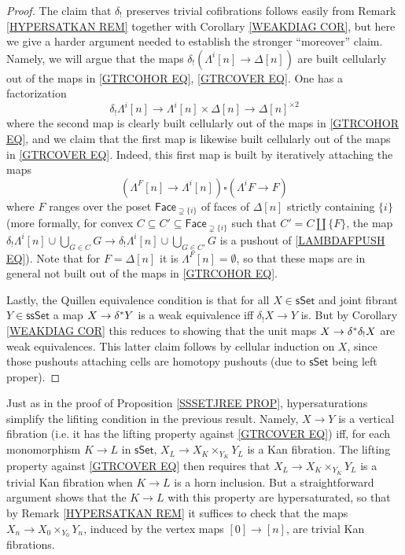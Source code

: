 \documentclass[a4paper,10pt
]{article}%
\begin{document}
\begin{proof}
The claim that $\delta_!$ preserves trivial cofibrations follows easily from Remark \ref{HYPERSATKAN REM} together with Corollary \ref{WEAKDIAG COR}, but here we give a harder argument needed to establish the stronger ``moreover'' claim.
Namely, we will argue that the maps
$\delta_! \left( \Lambda^i[n] \to \Delta[n]\right)$
are built cellularly out of the maps in 
\eqref{GTRCOHOR EQ}, \eqref{GTRCOVER EQ}.
One has a factorization
\[
	\delta_! \Lambda^i[n] \to
	\Lambda^i[n] \times \Delta[n] \to \Delta[n]^{\times 2}
\]
where the second map is clearly built cellularly out of the maps in 
\eqref{GTRCOHOR EQ}, and we claim that 
the first map is likewise built cellularly out of the maps in \eqref{GTRCOVER EQ}.
Indeed, this first map is built by iteratively attaching the maps
\begin{equation}\label{LAMBDAFPUSH EQ}
	\left(\Lambda^{F}[n] \to \Lambda^i[n] \right)
		\square
	\left(\Lambda^{i}F \to F \right)
\end{equation}
where $F$ ranges over the poset $\mathsf{Face}_{\supsetneq \{i\}}$
of faces of $\Delta[n]$ strictly containing $\{i\}$
(more formally, for convex
$C \subseteq C' \subseteq \mathsf{Face}_{\supsetneq \{i\}}$ such that $C' = C \amalg \{F\}$,
the map 
$\delta_! \Lambda^i[n] \cup \bigcup_{G \in C} G
\to
\delta_! \Lambda^i[n] \cup \bigcup_{G \in C'} G$
is a pushout of \eqref{LAMBDAFPUSH EQ}).
Note that for $F=\Delta[n]$ it is $\Lambda^F[n]=\emptyset$, so that these maps are in general not built out of the maps in \eqref{GTRCOHOR EQ}. 

Lastly, the Quillen equivalence condition 
is that for all $X \in \mathsf{sSet}$ and joint fibrant
$Y \in \mathsf{ssSet}$ a map
$X \to \delta^{\**} Y$ is a weak equivalence iff 
$\delta_!X \to Y$ is. 
But by Corollary \ref{WEAKDIAG COR}
this reduces to showing
that the unit maps $X \to \delta^{\**} \delta_! X$
are weak equivalences. This latter claim follows by cellular induction on $X$, since those pushouts attaching cells are homotopy pushouts (due to $\mathsf{sSet}$ being left proper).
\end{proof}


\begin{remark}\label{HYPERSIMPL REM}
	Just as in the proof of Proposition \ref{SSSETJREE PROP}, hypersaturations simplify the lifiting condition
	in the previous result. 
	Namely,	$X \to Y$ is a vertical fibration (i.e. it has the lifting property against \eqref{GTRCOVER EQ})
	iff, for each monomorphism $K \to L$ in $\mathsf{sSet}$,
	$X_L \to X_K \times_{Y_K} Y_L$
	is a Kan fibration.
	The lifting property against \eqref{GTRCOVER EQ}
	then requires that 
	$X_L \to X_K \times_{Y_K} Y_L$ is a trivial Kan fibration
	when $K \to L$ is a horn inclusion. 
	But a straightforward argument shows that the $K \to L$ with this property are hypersaturated,
	so that by 
Remark \ref{HYPERSATKAN REM} it suffices to check that the maps $X_n \to X_0 \times_{Y_0} Y_n$, induced by the vertex maps $[0] \to [n]$, are trivial Kan fibrations.
\end{remark}
\end{document}
